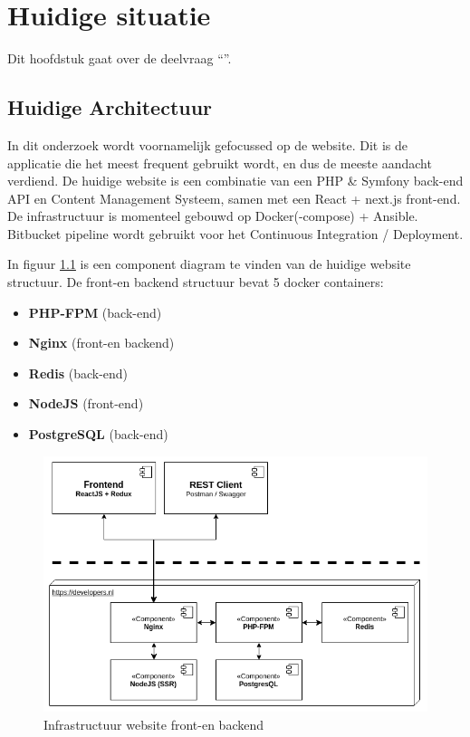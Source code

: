 \chapter{Huidige situatie}

\label{Chapter4}

Dit hoofdstuk gaat over de deelvraag \enquote{\deelhuidig}.

\section{Huidige Architectuur}
In dit onderzoek wordt voornamelijk gefocussed op de website. Dit is de applicatie die het meest frequent gebruikt wordt, en dus de meeste aandacht verdiend. De huidige website is een combinatie van een PHP \& Symfony back-end API en Content Management Systeem, samen met een React + next.js front-end. De infrastructuur is momenteel gebouwd op Docker(-compose) + Ansible. Bitbucket pipeline wordt gebruikt voor het Continuous Integration / Deployment. 

In figuur \ref{fig:infra} is een component diagram te vinden van de huidige website structuur. De front-en backend structuur bevat 5 docker containers:
\begin{itemize}
	\item \textbf{PHP-FPM} (back-end)
	\item \textbf{Nginx} (front-en backend)
	\item \textbf{Redis} (back-end)
	\item \textbf{NodeJS} (front-end)
	\item \textbf{PostgreSQL} (back-end)
\end{itemize}

\begin{figure}
	\centering
	\includegraphics[width=13cm]{Figures/Infrastructure}
	\decoRule
	\caption[Infrastructuur]{Infrastructuur website front-en backend \parencite{Documentation}}
	\label{fig:infra}
\end{figure}

